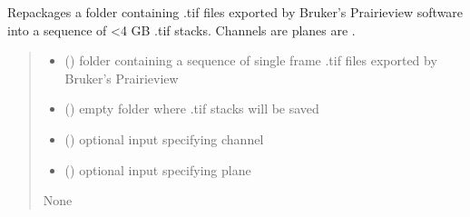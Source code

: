 \documentclass[letterpaper,10pt,english]{sphinxmanual}
\begin{document}
\begin{fulllineitems}
\label{\detokenize{CalSciPy.bruker:CalSciPy.bruker.repackage_bruker_tifs}}
\pysigstartsignatures
{}
\pysigstopsignatures
\sphinxAtStartPar
Repackages a folder containing .tif files exported by Bruker’s Prairieview software into a sequence of \textless{}4 GB .tif
stacks. Channels are planes are .
\begin{quote}\begin{description}
\begin{itemize}
\item {} 
\sphinxAtStartPar
{} () \textendash{} folder containing a sequence of single frame .tif files exported by Bruker’s Prairieview

\item {} 
\sphinxAtStartPar
{} () \textendash{} empty folder where .tif stacks will be saved

\item {} 
\sphinxAtStartPar
{} () \textendash{} optional input specifying channel

\item {} 
\sphinxAtStartPar
{} () \textendash{} optional input specifying plane

\end{itemize}

\sphinxAtStartPar
None

\end{description}\end{quote}

\end{fulllineitems}
\end{document}
